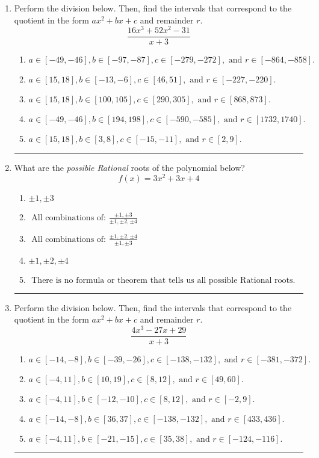 \documentclass[14pt]{extbook}
\newcommand{\litem}[1]{\item#1\hspace*{-1cm}\rule{\textwidth}{0.4pt}}
\begin{document}
\begin{enumerate}
\litem{
Perform the division below. Then, find the intervals that correspond to the quotient in the form $ax^2+bx+c$ and remainder $r$.\[ \frac{16x^{3} +52 x^{2} -31}{x + 3} \]\begin{enumerate}[label=\Alph*.]
\item \( a \in [-49, -46], b \in [-97, -87], c \in [-279, -272], \text{ and } r \in [-864, -858]. \)
\item \( a \in [15, 18], b \in [-13, -6], c \in [46, 51], \text{ and } r \in [-227, -220]. \)
\item \( a \in [15, 18], b \in [100, 105], c \in [290, 305], \text{ and } r \in [868, 873]. \)
\item \( a \in [-49, -46], b \in [194, 198], c \in [-590, -585], \text{ and } r \in [1732, 1740]. \)
\item \( a \in [15, 18], b \in [3, 8], c \in [-15, -11], \text{ and } r \in [2, 9]. \)

\end{enumerate} }
\litem{
What are the \textit{possible Rational} roots of the polynomial below?\[ f(x) = 3x^{2} +3 x + 4 \]\begin{enumerate}[label=\Alph*.]
\item \( \pm 1,\pm 3 \)
\item \( \text{ All combinations of: }\frac{\pm 1,\pm 3}{\pm 1,\pm 2,\pm 4} \)
\item \( \text{ All combinations of: }\frac{\pm 1,\pm 2,\pm 4}{\pm 1,\pm 3} \)
\item \( \pm 1,\pm 2,\pm 4 \)
\item \( \text{ There is no formula or theorem that tells us all possible Rational roots.} \)

\end{enumerate} }
\litem{
Perform the division below. Then, find the intervals that correspond to the quotient in the form $ax^2+bx+c$ and remainder $r$.\[ \frac{4x^{3} -27 x + 29}{x + 3} \]\begin{enumerate}[label=\Alph*.]
\item \( a \in [-14, -8], b \in [-39, -26], c \in [-138, -132], \text{ and } r \in [-381, -372]. \)
\item \( a \in [-4, 11], b \in [10, 19], c \in [8, 12], \text{ and } r \in [49, 60]. \)
\item \( a \in [-4, 11], b \in [-12, -10], c \in [8, 12], \text{ and } r \in [-2, 9]. \)
\item \( a \in [-14, -8], b \in [36, 37], c \in [-138, -132], \text{ and } r \in [433, 436]. \)
\item \( a \in [-4, 11], b \in [-21, -15], c \in [35, 38], \text{ and } r \in [-124, -116]. \)


\end{enumerate}}
\end{enumerate}
\end{document}
